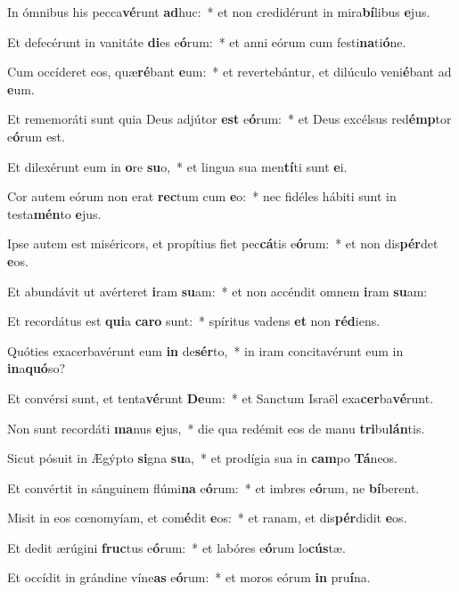 \item In ómnibus his pecca\textbf{vé}runt \textbf{ad}huc:~* et non credidérunt in mira\textbf{bí}libus \textbf{e}jus.
\item Et defecérunt in vanitáte \textbf{di}es e\textbf{ó}rum:~* et anni eórum cum festi\textbf{na}ti\textbf{ó}ne.
\item Cum occíderet eos, quæ\textbf{ré}bant \textbf{e}um:~* et revertebántur, et dilúculo veni\textbf{é}bant ad \textbf{e}um.
\item Et rememoráti sunt quia Deus adjútor \textbf{est} e\textbf{ó}rum:~* et Deus excélsus red\textbf{émp}tor e\textbf{ó}rum est.
\item Et dilexérunt eum in \textbf{o}re \textbf{su}o,~* et lingua sua men\textbf{tí}ti sunt \textbf{e}i.
\item Cor autem eórum non erat \textbf{rec}tum cum \textbf{e}o:~* nec fidéles hábiti sunt in testa\textbf{mén}to \textbf{e}jus.
\item Ipse autem est miséricors, et propítius fiet pec\textbf{cá}tis e\textbf{ó}rum:~* et non dis\textbf{pér}det \textbf{e}os.
\item Et abundávit ut avérteret \textbf{i}ram \textbf{su}am:~* et non accéndit omnem \textbf{i}ram \textbf{su}am:
\item Et recordátus est \textbf{qui}a \textbf{ca}\textbf{ro} sunt:~* spíritus vadens \textbf{et} non \textbf{réd}iens.
\item Quóties exacerbavérunt eum \textbf{in} de\textbf{sér}to,~* in iram concitavérunt eum in \textbf{in}a\textbf{quó}so?
\item Et convérsi sunt, et tenta\textbf{vé}runt \textbf{De}um:~* et Sanctum Israël exa\textbf{cer}ba\textbf{vé}runt.
\item Non sunt recordáti \textbf{ma}nus \textbf{e}jus,~* die qua redémit eos de manu \textbf{tri}bu\textbf{lán}tis.
\item Sicut pósuit in Ægýpto \textbf{si}gna \textbf{su}a,~* et prodígia sua in \textbf{cam}po \textbf{Tá}neos.
\item Et convértit in sánguinem flúmi\textbf{na} e\textbf{ó}rum:~* et imbres e\textbf{ó}rum, ne \textbf{bí}berent.
\item Misit in eos cœnomyíam, et com\textbf{é}dit \textbf{e}os:~* et ranam, et dis\textbf{pér}didit \textbf{e}os.
\item Et dedit ærúgini \textbf{fruc}tus e\textbf{ó}rum:~* et labóres e\textbf{ó}rum lo\textbf{cús}tæ.
\item Et occídit in grándine víne\textbf{as} e\textbf{ó}rum:~* et moros eórum \textbf{in} pru\textbf{í}na.
